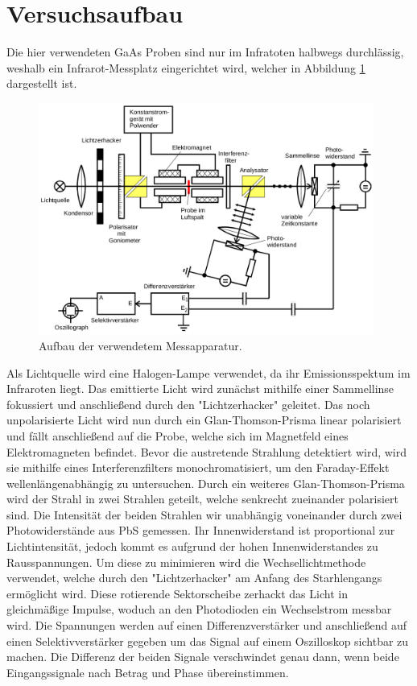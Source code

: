 \section{Versuchsaufbau}

Die hier verwendeten GaAs Proben sind nur im Infratoten halbwegs durchlässig, weshalb ein
Infrarot-Messplatz eingerichtet wird, welcher in Abbildung \ref{fig:aufbau} dargestellt ist.

\begin{figure}[H]
  \centering
  \includegraphics[width=11cm]{Aufbau.png}
  \caption{Aufbau der verwendetem Messapparatur.}
  \label{fig:aufbau}
\end{figure}

Als Lichtquelle wird eine Halogen-Lampe verwendet, da ihr Emissionsspektum im Infraroten liegt.
Das emittierte Licht wird zunächst mithilfe einer Sammellinse fokussiert und anschließend durch
den "Lichtzerhacker" geleitet. Das noch unpolarisierte Licht wird nun durch ein Glan-Thomson-Prisma
linear polarisiert und fällt anschließend auf die Probe, welche sich im Magnetfeld eines
Elektromagneten befindet.
Bevor die austretende Strahlung detektiert wird, wird sie mithilfe eines Interferenzfilters monochromatisiert,
um den Faraday-Effekt wellenlängenabhängig zu untersuchen. Durch ein weiteres Glan-Thomson-Prisma wird der
Strahl in zwei Strahlen geteilt, welche senkrecht zueinander polarisiert sind. Die Intensität der beiden
Strahlen wir unabhängig voneinander durch zwei Photowiderstände aus PbS gemessen. Ihr Innenwiderstand ist
proportional zur Lichtintensität, jedoch kommt es aufgrund der hohen Innenwiderstandes zu Rausspannungen.
Um diese zu minimieren wird die Wechsellichtmethode verwendet, welche durch den "Lichtzerhacker" am Anfang des
Starhlengangs ermöglicht wird. Diese rotierende Sektorscheibe zerhackt das Licht in gleichmäßige Impulse, woduch
an den Photodioden ein Wechselstrom messbar wird. Die Spannungen werden auf einen Differenzverstärker und anschließend auf
einen Selektivverstärker gegeben um das Signal auf einem Oszilloskop sichtbar zu machen.
Die Differenz der beiden Signale verschwindet genau dann, wenn beide Eingangssignale nach Betrag und Phase
übereinstimmen.


